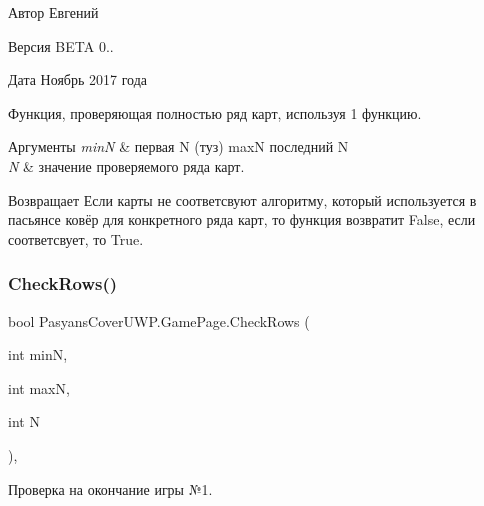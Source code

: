 \begin{DoxyAuthor}{Автор}
Евгений 
\end{DoxyAuthor}
\begin{DoxyVersion}{Версия}
B\+E\+TA 0.. 
\end{DoxyVersion}
\begin{DoxyDate}{Дата}
Ноябрь 2017 года
\end{DoxyDate}
Функция, проверяющая полностью ряд карт, используя 1 функцию. 
\begin{DoxyParams}{Аргументы}
{\em minN} & первая N (туз)  maxN последний N \\
\hline
{\em N} & значение проверяемого ряда карт. \\
\hline
\end{DoxyParams}
\begin{DoxyReturn}{Возвращает}
Если карты не соответсвуют алгоритму, который используется в пасьянсе ковёр для конкретного ряда карт, то функция возвратит False, если соответсвует, то True. 
\end{DoxyReturn}
\mbox{\label{class_pasyans_cover_u_w_p_1_1_game_page_a03b4af2d9a04735bbc7e7d6331d220d4}} 
\subsubsection{\texorpdfstring{Check\+Rows()}{CheckRows()}}
{\footnotesize\ttfamily bool Pasyans\+Cover\+U\+W\+P.\+Game\+Page.\+Check\+Rows (\begin{DoxyParamCaption}\item[{int}]{minN,  }\item[{int}]{maxN,  }\item[{int}]{N }\end{DoxyParamCaption})\hspace{0.3cm}{\ttfamily [inline]}, {\ttfamily [private]}}



Проверка на окончание игры №1. 

